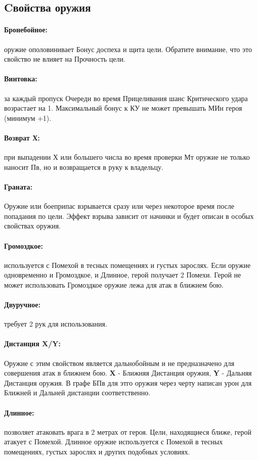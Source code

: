\subsection{Cвойства оружия}
\paragraph{Бронебойное:} оружие ополовинивает Бонус доспеха и щита цели. Обратите внимание, что это свойство не влияет на Прочность цели.
\paragraph{Винтовка:} за каждый пропуск Очереди во время Прицеливания
шанс Критического удара возрастает на 1. Максимальный бонус к КУ
не может превышать МИн героя (минимум +1).
\paragraph{Возврат Х:} при выпадении Х или большего числа во время проверки Мт оружие не только наносит Пв, но и возвращается в руку к владельцу.
\paragraph{Граната:} Оружие или боеприпас взрывается сразу или через некоторое время после попадания по цели. Эффект взрыва зависит от начинки и будет описан в особых свойствах оружия.
\paragraph{Громоздкое:} используется с Помехой в тесных помещениях и густых зарослях. Если оружие одновременно и Громоздкое, и Длинное, герой получает 2 Помехи. Герой не может использовать Громоздкое оружие лежа для атак в ближнем бою.
\paragraph{Двуручное:} требует 2 рук для использования.
\paragraph{Дистанция X/Y:} Оружие с этим свойством является дальнобойным и не предназначено для совершения атак в ближнем бою. \textbf{X} - Ближняя Дистанция оружия, \textbf{Y} - Дальняя Дистанция оружия. В графе БПв для этго оружия через черту написан урон для Ближней и Дальней дистанции соответственно.
\paragraph{Длинное:} позволяет атаковать врага в 2 метрах от героя. Цели, находящиеся ближе, герой атакует с Помехой. Длинное оружие используется с Помехой в тесных помещениях, густых зарослях и других подобных условиях.
